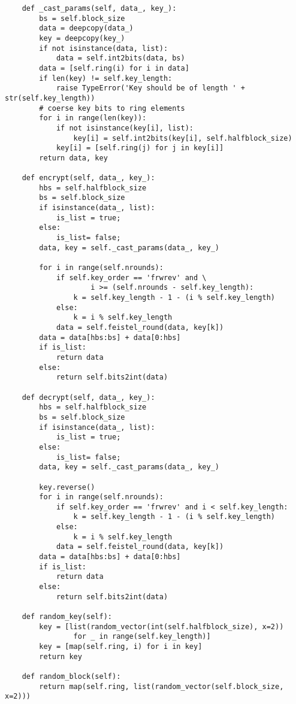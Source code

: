 \begin{lstlisting}
    def _cast_params(self, data_, key_):
        bs = self.block_size
        data = deepcopy(data_)
        key = deepcopy(key_)
        if not isinstance(data, list):
            data = self.int2bits(data, bs)
        data = [self.ring(i) for i in data]
        if len(key) != self.key_length:
            raise TypeError('Key should be of length ' + str(self.key_length))
        # coerse key bits to ring elements
        for i in range(len(key)):
            if not isinstance(key[i], list):
                key[i] = self.int2bits(key[i], self.halfblock_size)
            key[i] = [self.ring(j) for j in key[i]]
        return data, key

    def encrypt(self, data_, key_):
        hbs = self.halfblock_size
        bs = self.block_size
        if isinstance(data_, list):
            is_list = true;
        else:
            is_list= false;
        data, key = self._cast_params(data_, key_)

        for i in range(self.nrounds):
            if self.key_order == 'frwrev' and \
                    i >= (self.nrounds - self.key_length):
                k = self.key_length - 1 - (i % self.key_length)
            else:
                k = i % self.key_length
            data = self.feistel_round(data, key[k])
        data = data[hbs:bs] + data[0:hbs]
        if is_list:
            return data
        else:
            return self.bits2int(data)

    def decrypt(self, data_, key_):
        hbs = self.halfblock_size
        bs = self.block_size
        if isinstance(data_, list):
            is_list = true;
        else:
            is_list= false;
        data, key = self._cast_params(data_, key_)

        key.reverse()
        for i in range(self.nrounds):
            if self.key_order == 'frwrev' and i < self.key_length:
                k = self.key_length - 1 - (i % self.key_length)
            else:
                k = i % self.key_length
            data = self.feistel_round(data, key[k])
        data = data[hbs:bs] + data[0:hbs]
        if is_list:
            return data
        else:
            return self.bits2int(data)

    def random_key(self):
        key = [list(random_vector(int(self.halfblock_size), x=2))
                for _ in range(self.key_length)]
        key = [map(self.ring, i) for i in key]
        return key

    def random_block(self):
        return map(self.ring, list(random_vector(self.block_size, x=2)))


\end{lstlisting}
